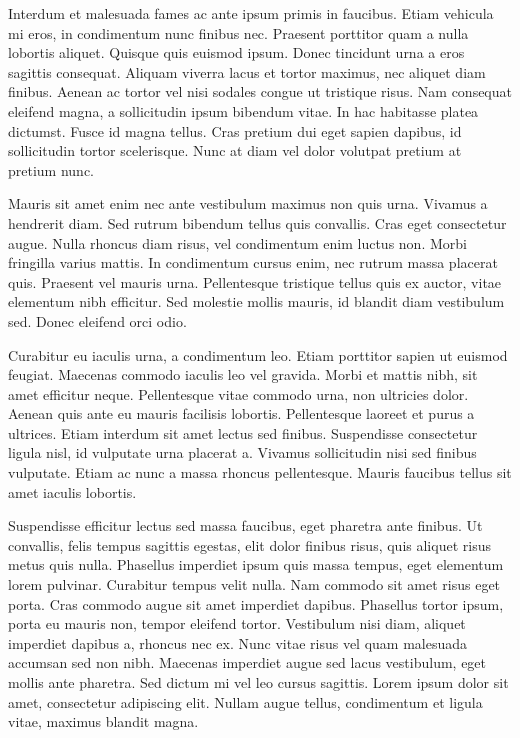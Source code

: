 \documentclass{article}
\begin{document}
Interdum et malesuada fames ac ante ipsum primis in faucibus. Etiam vehicula mi eros, in condimentum nunc finibus nec. Praesent porttitor quam a nulla lobortis aliquet. Quisque quis euismod ipsum. Donec tincidunt urna a eros sagittis consequat. Aliquam viverra lacus et tortor maximus, nec aliquet diam finibus. Aenean ac tortor vel nisi sodales congue ut tristique risus. Nam consequat eleifend magna, a sollicitudin ipsum bibendum vitae. In hac habitasse platea dictumst. Fusce id magna tellus. Cras pretium dui eget sapien dapibus, id sollicitudin tortor scelerisque. Nunc at diam vel dolor volutpat pretium at pretium nunc.


Mauris sit amet enim nec ante vestibulum maximus non quis urna. Vivamus a hendrerit diam. Sed rutrum bibendum tellus quis convallis. Cras eget consectetur augue. Nulla rhoncus diam risus, vel condimentum enim luctus non. Morbi fringilla varius mattis. In condimentum cursus enim, nec rutrum massa placerat quis. Praesent vel mauris urna. Pellentesque tristique tellus quis ex auctor, vitae elementum nibh efficitur. Sed molestie mollis mauris, id blandit diam vestibulum sed. Donec eleifend orci odio.


Curabitur eu iaculis urna, a condimentum leo. Etiam porttitor sapien ut euismod feugiat. Maecenas commodo iaculis leo vel gravida. Morbi et mattis nibh, sit amet efficitur neque. Pellentesque vitae commodo urna, non ultricies dolor. Aenean quis ante eu mauris facilisis lobortis. Pellentesque laoreet et purus a ultrices. Etiam interdum sit amet lectus sed finibus. Suspendisse consectetur ligula nisl, id vulputate urna placerat a. Vivamus sollicitudin nisi sed finibus vulputate. Etiam ac nunc a massa rhoncus pellentesque. Mauris faucibus tellus sit amet iaculis lobortis.


Suspendisse efficitur lectus sed massa faucibus, eget pharetra ante finibus. Ut convallis, felis tempus sagittis egestas, elit dolor finibus risus, quis aliquet risus metus quis nulla. Phasellus imperdiet ipsum quis massa tempus, eget elementum lorem pulvinar. Curabitur tempus velit nulla. Nam commodo sit amet risus eget porta. Cras commodo augue sit amet imperdiet dapibus. Phasellus tortor ipsum, porta eu mauris non, tempor eleifend tortor. Vestibulum nisi diam, aliquet imperdiet dapibus a, rhoncus nec ex. Nunc vitae risus vel quam malesuada accumsan sed non nibh. Maecenas imperdiet augue sed lacus vestibulum, eget mollis ante pharetra. Sed dictum mi vel leo cursus sagittis. Lorem ipsum dolor sit amet, consectetur adipiscing elit. Nullam augue tellus, condimentum et ligula vitae, maximus blandit magna.
\end{document}
